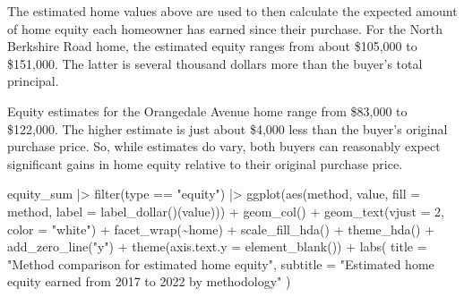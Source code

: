 \documentclass[
  letterpaper,
  DIV=11,
  numbers=noendperiod]{scrartcl}
\newenvironment{Shaded}{\begin{snugshade}}{\end{snugshade}}
\newcommand{\AttributeTok}[1]{\textcolor[rgb]{0.40,0.45,0.13}{#1}}
\newcommand{\DecValTok}[1]{\textcolor[rgb]{0.68,0.00,0.00}{#1}}
\newcommand{\FunctionTok}[1]{\textcolor[rgb]{0.28,0.35,0.67}{#1}}
\newcommand{\NormalTok}[1]{\textcolor[rgb]{0.00,0.23,0.31}{#1}}
\newcommand{\SpecialCharTok}[1]{\textcolor[rgb]{0.37,0.37,0.37}{#1}}
\newcommand{\StringTok}[1]{\textcolor[rgb]{0.13,0.47,0.30}{#1}}
\begin{document}
The estimated home values above are used to then calculate the expected
amount of home equity each homeowner has earned since their purchase.
For the North Berkshire Road home, the estimated equity ranges from
about \$105,000 to \$151,000. The latter is several thousand dollars
more than the buyer's total principal.

Equity estimates for the Orangedale Avenue home range from \$83,000 to
\$122,000. The higher estimate is just about \$4,000 less than the
buyer's original purchase price. So, while estimates do vary, both
buyers can reasonably expect significant gains in home equity relative
to their original purchase price.

\begin{Shaded}
\begin{Highlighting}[]
\NormalTok{equity\_sum }\SpecialCharTok{|\textgreater{}} 
  \FunctionTok{filter}\NormalTok{(type }\SpecialCharTok{==} \StringTok{"equity"}\NormalTok{) }\SpecialCharTok{|\textgreater{}} 
  \FunctionTok{ggplot}\NormalTok{(}\FunctionTok{aes}\NormalTok{(method, value, }\AttributeTok{fill =}\NormalTok{ method,}
             \AttributeTok{label =} \FunctionTok{label\_dollar}\NormalTok{()(value))) }\SpecialCharTok{+}
  \FunctionTok{geom\_col}\NormalTok{() }\SpecialCharTok{+}
  \FunctionTok{geom\_text}\NormalTok{(}\AttributeTok{vjust =} \DecValTok{2}\NormalTok{,}
            \AttributeTok{color =} \StringTok{"white"}\NormalTok{) }\SpecialCharTok{+}
  \FunctionTok{facet\_wrap}\NormalTok{(}\SpecialCharTok{\textasciitilde{}}\NormalTok{home) }\SpecialCharTok{+}
  \FunctionTok{scale\_fill\_hda}\NormalTok{() }\SpecialCharTok{+}
  \FunctionTok{theme\_hda}\NormalTok{() }\SpecialCharTok{+}
  \FunctionTok{add\_zero\_line}\NormalTok{(}\StringTok{"y"}\NormalTok{) }\SpecialCharTok{+}
  \FunctionTok{theme}\NormalTok{(}\AttributeTok{axis.text.y =} \FunctionTok{element\_blank}\NormalTok{()) }\SpecialCharTok{+}
  \FunctionTok{labs}\NormalTok{(}
    \AttributeTok{title =} \StringTok{"Method comparison for estimated home equity"}\NormalTok{,}
    \AttributeTok{subtitle =} \StringTok{"Estimated home equity earned from 2017 to 2022 by methodology"}
\NormalTok{  )}
\end{Highlighting}
\end{Shaded}
\end{document}
